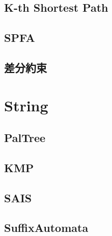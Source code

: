 \documentclass[a4paper,10pt,twocolumn,oneside]{article}
\begin{document}
\subsection{K-th Shortest Path}


\subsection{SPFA}


\subsection{差分約束}

%

% 

\section{String}
\subsection{PalTree}


%

\subsection{KMP}


\subsection{SAIS}


\subsection{SuffixAutomata}

\end{document}
